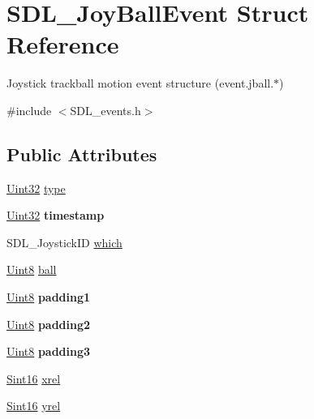 \hypertarget{struct_s_d_l___joy_ball_event}{}\section{S\+D\+L\+\_\+\+Joy\+Ball\+Event Struct Reference}
\label{struct_s_d_l___joy_ball_event}


Joystick trackball motion event structure (event.\+jball.$\ast$)  




{\ttfamily \#include $<$S\+D\+L\+\_\+events.\+h$>$}

\subsection*{Public Attributes}
\begin{DoxyCompactItemize}
\item 
\hyperlink{_s_d_l__stdinc_8h_add440eff171ea5f55cb00c4a9ab8672d}{Uint32} \hyperlink{struct_s_d_l___joy_ball_event_a0b192b95a043cb494b27ed9b27e84db1}{type}
\item 
\hypertarget{struct_s_d_l___joy_ball_event_aa8e4fb91af62e316bb9a3219ab76148d}{}\hyperlink{_s_d_l__stdinc_8h_add440eff171ea5f55cb00c4a9ab8672d}{Uint32} {\bfseries timestamp}\label{struct_s_d_l___joy_ball_event_aa8e4fb91af62e316bb9a3219ab76148d}

\item 
S\+D\+L\+\_\+\+Joystick\+I\+D \hyperlink{struct_s_d_l___joy_ball_event_a4e2e185717d529167cd0bea21093c454}{which}
\item 
\hyperlink{_s_d_l__stdinc_8h_a2944638813a090aa23e62f4da842c3e2}{Uint8} \hyperlink{struct_s_d_l___joy_ball_event_add4eb0daeaf95ae56e8c7cfcec560242}{ball}
\item 
\hypertarget{struct_s_d_l___joy_ball_event_aff75a6519ca2a19cffdc14ebf4626613}{}\hyperlink{_s_d_l__stdinc_8h_a2944638813a090aa23e62f4da842c3e2}{Uint8} {\bfseries padding1}\label{struct_s_d_l___joy_ball_event_aff75a6519ca2a19cffdc14ebf4626613}

\item 
\hypertarget{struct_s_d_l___joy_ball_event_a0ea3071b99ac096b0157714f01ff04f8}{}\hyperlink{_s_d_l__stdinc_8h_a2944638813a090aa23e62f4da842c3e2}{Uint8} {\bfseries padding2}\label{struct_s_d_l___joy_ball_event_a0ea3071b99ac096b0157714f01ff04f8}

\item 
\hypertarget{struct_s_d_l___joy_ball_event_acb700712f1a4070bc114ef9d55b00640}{}\hyperlink{_s_d_l__stdinc_8h_a2944638813a090aa23e62f4da842c3e2}{Uint8} {\bfseries padding3}\label{struct_s_d_l___joy_ball_event_acb700712f1a4070bc114ef9d55b00640}

\item 
\hyperlink{_s_d_l__stdinc_8h_a9d0257032c0e146ab6121bf0122712f5}{Sint16} \hyperlink{struct_s_d_l___joy_ball_event_a959a8473aa1964e5e1778c27a9ffd261}{xrel}
\item 
\hyperlink{_s_d_l__stdinc_8h_a9d0257032c0e146ab6121bf0122712f5}{Sint16} \hyperlink{struct_s_d_l___joy_ball_event_a28ad48a9eb7a5d3ff62ccba09fcead76}{yrel}
\end{DoxyCompactItemize}


